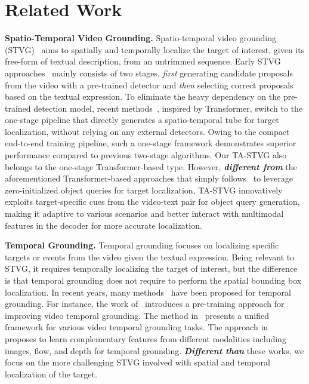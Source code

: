 \section{Related Work}
\textbf{Spatio-Temporal Video Grounding.} Spatio-temporal video grounding (STVG)~\citep{STGRN} aims to spatially and temporally localize the target of interest, given its free-form of textual description, from an untrimmed sequence. Early STVG approaches~\citep{STGRN, OAMBRN, hcstvg} mainly consists of two stages, \emph{first} generating candidate proposals from the video with a pre-trained detector and \emph{then} selecting correct proposals based on the textual expression. To eliminate the heavy dependency on the pre-trained detection model, recent methods~\citep{STVGBert, TubeDETR,STCAT,csdvl,talal2023video,cgstvg}, inspired by Transformer, switch to the one-stage pipeline that directly generates a spatio-temporal tube for target localization, without relying on any external detectors. Owing to the compact end-to-end training pipeline, such a one-stage framework demonstrates superior performance compared to previous two-stage algorithms. Our TA-STVG also belongs to the one-stage Transformer-based type. However, \emph{\textbf{different from}} the aforementioned Transformer-based approaches that simply follows~\citep{dert} to leverage zero-initialized object queries for target localization, TA-STVG innovatively exploits target-specific cues from the video-text pair for object query generation, making it adaptive to various scenarios and better interact with multimodal features in the decoder for more accurate localization. 


\textbf{Temporal Grounding.} Temporal grounding focuses on localizing specific targets or events from the video given the textual expression. Being relevant to STVG, it requires temporally localizing the target of interest, but the difference is that temporal grounding does not require to perform the spatial bounding box localization.
In recent years, many methods~\citep{locvtp,drft,mun2020local,hao2022can,wang2023protege,zhang2023text,lmmg,lin2023univtg} have been proposed for temporal grounding. For instance, the work of~\citep{wang2023protege} introduces a pre-training approach for improving video temporal grounding. The method in~\citep{lin2023univtg} presents a unified framework for various video temporal grounding tasks. The approach in~\citep{drft} proposes to learn complementary features from different modalities including images, flow, and depth for temporal grounding. \textbf{\emph{Different than}} these works, we focus on the more challenging STVG involved with spatial and temporal localization of the target.

